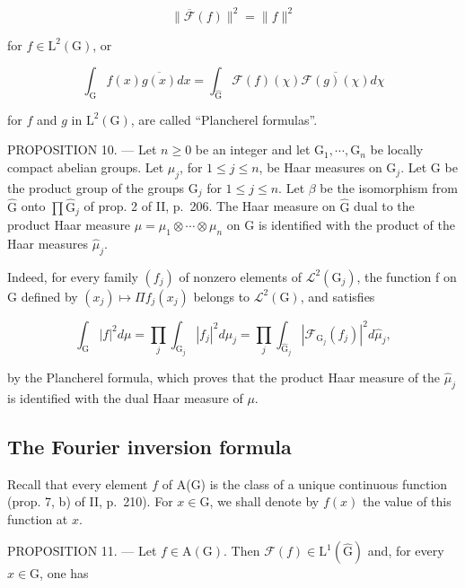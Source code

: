 \[
\| \overline {{\mathcal {F}}} (f) \| ^ {2} = \| f \| ^ {2}\tag{23}
\]

for \(f\in \mathrm{L}^2 (\mathrm{G})\), or

\[
\int_ {\mathrm{G}} f (x) \overline {{g (x)}} d x = \int_ {\widehat {\mathrm{G}}} \mathcal {F} (f) (\chi) \overline {{\mathcal {F} (g) (\chi)}} d \chi\tag{24}
\]

for \(f\) and \(g\) in \(\mathrm{L}^2 (\mathrm{G})\), are called “Plancherel formulas”.

PROPOSITION 10. --- Let \(n \geqslant 0\) be an integer and let \(\mathrm{G}_{1}, \cdots, \mathrm{G}_{n}\) be locally compact abelian groups. Let \(\mu_{j}\), for \(1 \leqslant j \leqslant n\), be Haar measures on \(\mathrm{G}_{j}\). Let G be the product group of the groups \(\mathrm{G}_{j}\) for \(1 \leqslant j \leqslant n\). Let \(\beta\) be the isomorphism from \(\widehat{\mathrm{G}}\) onto \(\prod \widehat{\mathrm{G}}_{j}\) of prop. 2 of II, p.~206. The Haar measure on \(\widehat{\mathrm{G}}\) dual to the product Haar measure \(\mu = \mu_{1} \otimes \cdots \otimes \mu_{n}\) on G is identified with the product of the Haar measures \(\widehat{\mu}_{j}\).

Indeed, for every family \((f_{j})\) of nonzero elements of \(\mathcal{L}^{2}(\mathrm{G}_{j})\), the function f on G defined by \((x_{j})\mapsto\Pi f_{j}(x_{j})\) belongs to \(\mathcal{L}^{2}(\mathrm{G})\), and satisfies

\[
\int_ {\mathrm{G}} | f | ^ {2} d \mu = \prod_ {j} \int_ {\mathrm{G} _ {j}} | f _ {j} | ^ {2} d \mu_ {j} = \prod_ {j} \int_ {\widehat {\mathrm{G}} _ {j}} | \mathcal {F} _ {\mathrm{G} _ {j}} (f _ {j}) | ^ {2} d \widehat {\mu} _ {j},
\]

by the Plancherel formula, which proves that the product Haar measure of the \(\widehat{\mu}_{j}\) is identified with the dual Haar measure of \(\mu\).

\subsection{The Fourier inversion formula}

Recall that every element \(f\) of A(G) is the class of a unique continuous function (prop. 7, b) of II, p.~210). For \(x \in \mathrm{G}\), we shall denote by \(f(x)\) the value of this function at \(x\).

PROPOSITION 11. --- Let \(f \in \mathrm{A}(\mathrm{G})\). Then \(\mathcal{F}(f) \in \mathrm{L}^1(\widehat{\mathrm{G}})\) and, for every \(x \in \mathrm{G}\), one has

